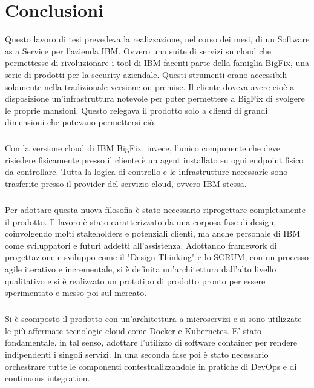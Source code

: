 \chapter{Conclusioni}

Questo lavoro di tesi prevedeva la realizzazione, nel corso dei mesi, di un Software as a Service per l'azienda IBM. Ovvero una suite di servizi su cloud che permettesse di rivoluzionare i tool di IBM facenti parte della famiglia BigFix, una serie di prodotti per la security aziendale. Questi strumenti erano accessibili solamente nella tradizionale versione on premise. Il cliente doveva avere cioè a disposizione un'infrastruttura notevole per poter permettere a BigFix di svolgere le proprie mansioni. Questo relegava il prodotto solo a clienti di grandi dimensioni che potevano permettersi ciò. 
\paragraph{}
Con la versione cloud di IBM BigFix, invece, l'unico componente che deve risiedere fisicamente presso il cliente è un agent installato su ogni endpoint fisico da controllare. Tutta la logica di controllo e le infrastrutture necessarie sono trasferite presso il provider del servizio cloud, ovvero IBM stessa.

\paragraph{}
Per adottare questa nuova filosofia è stato necessario riprogettare completamente il prodotto. Il lavoro è stato caratterizzato da una corposa fase di design, coinvolgendo molti stakeholders e potenziali clienti, ma anche personale di IBM come sviluppatori e futuri addetti all'assistenza. Adottando framework di progettazione e sviluppo come il "Design Thinking" e lo SCRUM, con un processo agile iterativo e incrementale, si è definita un'architettura dall'alto livello qualitativo e si è realizzato un prototipo di prodotto pronto per essere sperimentato e messo poi sul mercato.
\paragraph{}
Si è scomposto il prodotto con un'architettura a microservizi e si sono utilizzate le più affermate tecnologie cloud come Docker e Kubernetes. E' stato fondamentale, in tal senso, adottare l'utilizzo di software container per rendere indipendenti i singoli servizi. In una seconda fase poi è stato necessario orchestrare tutte le componenti contestualizzandole in pratiche di DevOps e di continuous integration.

